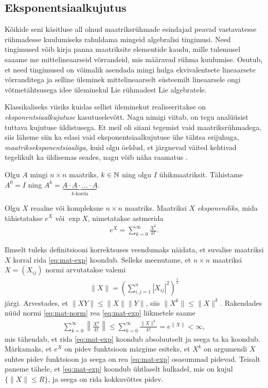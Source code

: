 \subsection{Eksponentsiaalkujutus}

Kõikide seni käsitluse all olnud maatriksrühmade esindajad peavad
vastavatesse rühmadesse kuulumiseks rahuldama mingeid algebralisi tingimusi.
Need tingimused võib kirja panna maatriksite elementide kaudu, mille
tulemusel saaame me mittelineaarseid võrrandeid, mis määravad rühma kuulumise.
Osutub, et need tingimused on võimalik asendada mingi hulga ekvivalentsete
lineaarsete võrranditega ja selline üleminek mittelineaarselt süsteemilt
lineaarsele ongi võtmetähtsusega idee üleminekul Lie rühmadest Lie
algebratele.\cite{johan1989survey}

Klassikaliseks viisiks kuidas sellist üleminekut realiseeritakse on
\emph{eksponentsiaalkujutuse} kasutuselevõtt. Nagu nimigi viitab, on
tegu analüüsist tuttava kujutuse üldistusega. Et meil oli siiani tegemist
vaid maatriksrühmadega, siis läheme siin ka edasi vaid eksponentsiaalkujutuse
ühe tähtsa erijuhuga, \emph{maatrikseksponentsiaaliga}, kuid olgu öeldud,
et järgnevad väited kehtivad tegelikult ka üldisemas seades,
nagu võib näha raamatus \cite{kirillov2008introduction}.

Olgu $A$ mingi $n \times n$ maatriks, $k \in \mathbb{N}$ ning olgu $I$
ühikmaatriksit. Tähistame $A^0 = I$ ning
$A^k = \underbrace{A \cdot A \cdot \ldots \cdot A}_{k\text{-korda}}$.

\begin{dfn}
    Olgu $X$ reaalne või kompleksne $n \times n$ maatriks. Maatriksi
    $X$ \emph{eksponendiks}, mida tähistatakse $e^X$ või $\exp X$, nimetatakse
    astmerida
    \begin{align}\label{eq:mat-exp}
        e^X = \sum_{k=0}^{\infty} \frac{X^k}{k!}.
    \end{align}
\end{dfn}

Ilmselt tuleks definitsiooni korrektsuses veendumaks näidata, et suvalise
maatriksi $X$ korral rida \eqref{eq:mat-exp} koondub. Selleks meenutame,
et $n \times n$ maatriksi $X = (X_{ij})$ normi arvutatakse valemi
\begin{align}\label{eq:mat-norm}
    \| X \| = \left( \sum_{i,j=1}^n |X_{ij}|^2 \right)^{\frac{1}{2}}
\end{align}
järgi. Arvestades, et $\| XY \| \le \|X\| \|Y\|$, siis $\|X^k\| \le \|X\|^k$.
Rakendades nüüd normi \eqref{eq:mat-norm} rea \eqref{eq:mat-exp} liikmetele
saame
\begin{align*}
    \sum_{k=0}^\infty \left\lVert \frac{X^k}{k!} \right\rVert \le
    \sum_{k=0}^\infty \frac{\|X\|^k}{k!} = e^{\|X\|} < \infty,
\end{align*}
mis tähendab, et rida \eqref{eq:mat-exp} koondub absoluutselt ja seega
ta ka koondub. Märkamaks, et $e^X$ on pidev funktsioon märgime esiteks,
et $X^k$ on argumendi $X$ suhtes pidev funktsioon ja seega on rea
\eqref{eq:mat-exp} osasummad pidevad. Teisalt paneme tähele, et
\eqref{eq:mat-exp} koondub ühtlaselt hulkadel, mis on kujul
$\{ \|X\| \le R \}$, ja seega on rida kokkuvõttes pidev.

